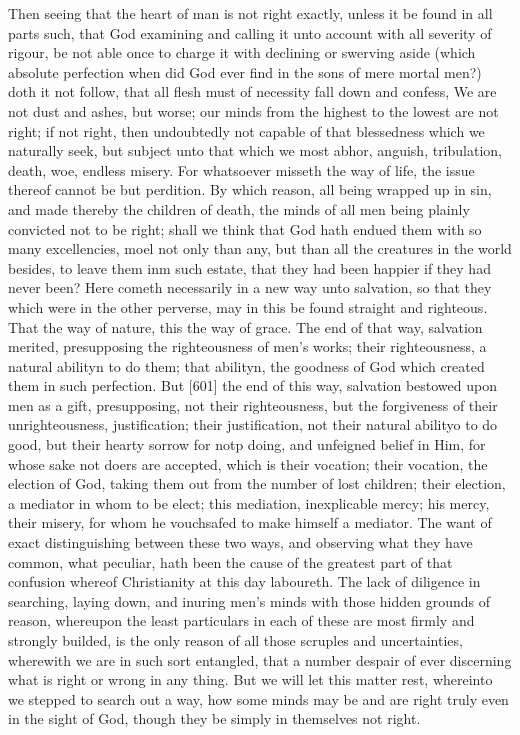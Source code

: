 Then seeing that the heart of man is not right exactly, unless it be found in all parts such, that God examining and calling it unto account with all severity of rigour, be not able once to charge it with declining or swerving aside (which absolute perfection when did God ever find in the sons of mere mortal men?) doth it not follow, that all flesh must of necessity fall down and confess, We are not dust and ashes, but worse; our minds from the highest to the lowest are not right; if not right, then undoubtedly not capable of that blessedness which we naturally seek, but subject unto that which we most abhor, anguish, tribulation, death, woe, endless misery. For whatsoever misseth the way of life, the issue thereof cannot be but perdition. By which reason, all being wrapped up in sin, and made thereby the children of death, the minds of all men being plainly convicted not to be right; shall we think that God hath endued them with so many excellencies, moel not only than any, but than all the creatures in the world besides, to leave them inm such estate, that they had been happier if they had never been? Here cometh necessarily in a new way unto salvation, so that they which were in the other perverse, may in this be found straight and righteous. That the way of nature, this the way of grace. The end of that way, salvation merited, presupposing the righteousness of men’s works; their righteousness, a natural abilityn to do them; that abilityn, the goodness of God which created them in such perfection. But [601] the end of this way, salvation bestowed upon men as a gift, presupposing, not their righteousness, but the forgiveness of their unrighteousness, justification; their justification, not their natural abilityo to do good, but their hearty sorrow for notp doing, and unfeigned belief in Him, for whose sake not doers are accepted, which is their vocation; their vocation, the election of God, taking them out from the number of lost children; their election, a mediator in whom to be elect; this mediation, inexplicable mercy; his mercy, their misery, for whom he vouchsafed to make himself a mediator. The want of exact distinguishing between these two ways, and observing what they have common, what peculiar, hath been the cause of the greatest part of that confusion whereof Christianity at this day laboureth. The lack of diligence in searching, laying down, and inuring men’s minds with those hidden grounds of reason, whereupon the least particulars in each of these are most firmly and strongly builded, is the only reason of all those scruples and uncertainties, wherewith we are in such sort entangled, that a number despair of ever discerning what is right or wrong in any thing. But we will let this matter rest, whereinto we stepped to search out a way, how some minds may be and are right truly even in the sight of God, though they be simply in themselves not right.

